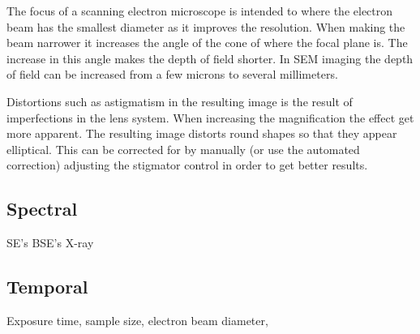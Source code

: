 The focus of a scanning electron microscope is intended to where the electron beam has the smallest diameter as it improves the resolution. When making the beam narrower it increases the angle of the cone of where the focal plane is. The increase in this angle makes the depth of field shorter. In SEM imaging the depth of field can be increased from a few microns to several millimeters. 


Distortions such as astigmatism in the resulting image is the result of imperfections in the lens system. When increasing the magnification the effect get more apparent. The resulting image distorts round shapes so that they appear elliptical. This can be corrected for by manually (or use the automated correction) adjusting the stigmator control in order to get better results. 

\subsection{Spectral}

SE's BSE's X-ray

\subsection{Temporal}
Exposure time, sample size, electron beam diameter, 






